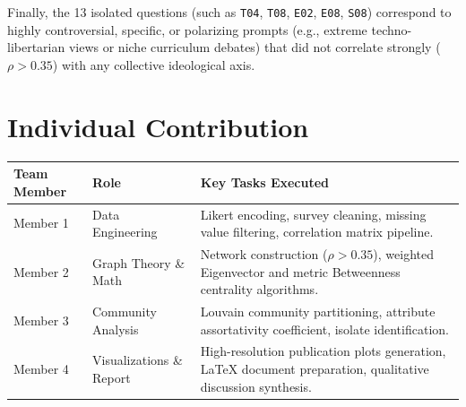 \documentclass[11pt,a4paper]{article}
\begin{document}
Finally, the 13 isolated questions (such as \texttt{T04}, \texttt{T08}, \texttt{E02}, \texttt{E08}, \texttt{S08}) correspond to highly controversial, specific, or polarizing prompts (e.g., extreme techno-libertarian views or niche curriculum debates) that did not correlate strongly ($\rho > 0.35$) with any collective ideological axis.

\section{Individual Contribution}
\begin{table}[htbp]
\centering
\small
\begin{tabular}{llp{9cm}}
\toprule
\textbf{Team Member} & \textbf{Role} & \textbf{Key Tasks Executed} \\
\midrule
Member 1 & Data Engineering & Likert encoding, survey cleaning, missing value filtering, correlation matrix pipeline. \\
Member 2 & Graph Theory \& Math & Network construction ($\rho > 0.35$), weighted Eigenvector and metric Betweenness centrality algorithms. \\
Member 3 & Community Analysis & Louvain community partitioning, attribute assortativity coefficient, isolate identification. \\
Member 4 & Visualizations \& Report & High-resolution publication plots generation, LaTeX document preparation, qualitative discussion synthesis. \\
\bottomrule
\end{tabular}
\end{table}
\end{document}
